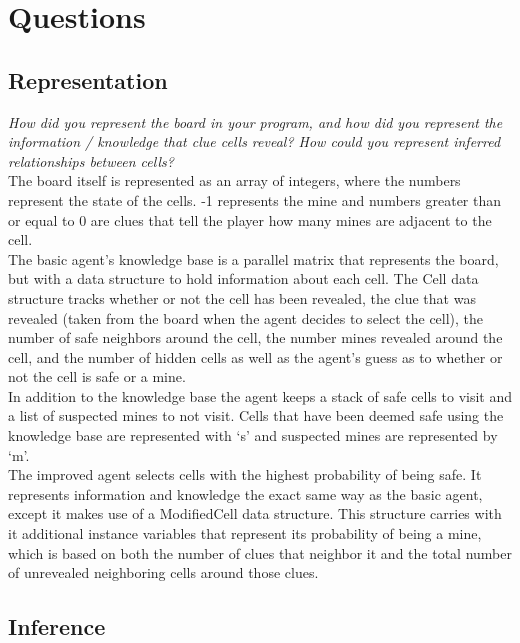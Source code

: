 \documentclass[11pt]{article} %
\begin{document}
\section{\textbf{Questions}}

\subsection{Representation}

\textit{How did you represent the board in your program, and how did you represent the information / knowledge that clue cells reveal? How could you represent inferred relationships between cells?}\\

The board itself is represented as an array of integers, where the numbers represent the state of the cells. -1 represents the mine and numbers greater than or equal to 0 are clues that tell the player how many mines are adjacent to the cell.\\

The basic agent’s knowledge base is a parallel matrix that represents the board, but with a data structure to hold information about each cell. The Cell data structure tracks whether or not the cell has been revealed, the clue that was revealed (taken from the board when the agent decides to select the cell), the number of safe neighbors around the cell, the number mines revealed around the cell, and the number of hidden cells as well as the agent’s guess as to whether or not the cell is safe or a mine.\\

In addition to the knowledge base the agent keeps a stack of safe cells to visit and a list of suspected mines to not visit. Cells that have been deemed safe using the knowledge base are represented with ‘s’ and suspected mines are represented by ‘m’.\\

The improved agent selects cells with the highest probability of being safe. It represents information and knowledge the exact same way as the basic agent, except it makes use of a ModifiedCell data structure. This structure carries with it additional instance variables that represent its probability of being a mine, which is based on both the number of clues that neighbor it and the total number of unrevealed neighboring cells around those clues. 

\subsection{Inference}
\end{document}
